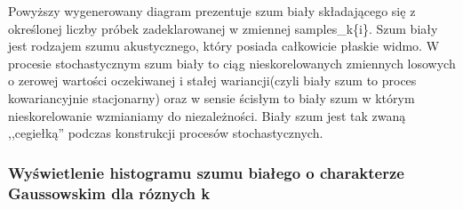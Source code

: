 \documentclass[11pt]{article}
\begin{document}
    Powyższy wygenerowany diagram prezentuje szum biały składającego się z
określonej liczby próbek zadeklarowanej w zmiennej samples\_k\{i\}. Szum
biały jest rodzajem szumu akustycznego, który posiada całkowicie płaskie
widmo. W procesie stochastycznym szum biały to ciąg nieskorelowanych
zmiennych losowych o zerowej wartości oczekiwanej i stałej
wariancji(czyli biały szum to proces kowariancyjnie stacjonarny) oraz w
sensie ścisłym to biały szum w którym nieskorelowanie wzmianiamy do
niezależności. Biały szum jest tak zwaną ,,cegiełką'' podczas
konstrukcji procesów stochastycznych.

    \hypertarget{wyux15bwietlenie-histogramu-szumu-biaux142ego-o-charakterze-gaussowskim-dla-ruxf3znych-k}{%
\subsubsection{Wyświetlenie histogramu szumu białego o charakterze
Gaussowskim dla róznych
k}\label{wyux15bwietlenie-histogramu-szumu-biaux142ego-o-charakterze-gaussowskim-dla-ruxf3znych-k}}
\end{document}
